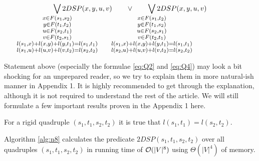 \begin{theorem}
\begin{enumerate}
\begin{align}
        \smashoperator{\bigvee_{
        \large \substack{
            x \in F(s_1, s_2)\\ 
            y \in F(t_1, t_2)\\ 
            u \in F(s_2, t_1)\\ 
            v \in F(t_2, s_1)\\ 
            l(s_1, x) + l(x, y) + l(y, t_1) = l(s_1, t_1)\\ 
            l(s_1, u) + l(u, v) + l(v, t_2) = l(s_2, t_2)
        }
        }} 2DSP(x, y, u, v)
        \quad\quad\vee\quad\quad
        \smashoperator{\bigvee_{
        \large \substack{
            x \in F(s_1, t_2)\\ 
            y \in F(t_1, s_2)\\ 
            u \in F(s_2, s_1)\\ 
            v \in F(t_2, t_1)\\ 
            l(s_1, x) + l(x, y) + l(y, t_1) = l(s_1, t_1)\\ 
            l(s_2, u) + l(u, v) + l(v, t_2) = l(s_2, t_2)
        }
        }} 2DSP(x, y, u, v) \label{eq:Q4} \\
\end{align}
\end{enumerate}
\end{theorem}

Statement above (especially the formulae \eqref{eq:Q2} and \eqref{eq:Q4}) may look a bit shocking for an unprepared reader, so we try to explain them in more natural-ish manner in Appendix 1. It is highly recommended to get through the explanation, although it is not required to understand the rest of the article. We will still formulate a few important results proven in the Appendix 1 here.

\begin{proposition} \label{eql}
For a rigid quadruple $(s_1, t_1, s_2, t_2)$ it is true that $l(s_1, t_1) = l(s_2, t_2)$.
\end{proposition}

\begin{theorem} 
Algorithm \ref{alg:n8} calculates the predicate $2DSP(s_1, t_1, s_2, t_2)$ over all quadruples $(s_1, t_1, s_2, t_2)$ in running time of $\mathcal{O}(|V|^8)$ using $\Theta(|V|^4)$ of memory. 
\end{theorem}
